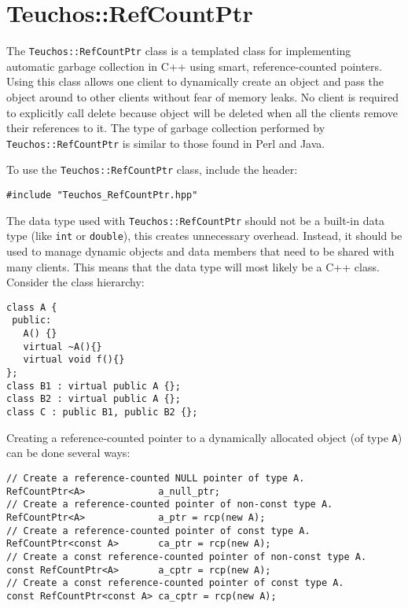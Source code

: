 
\section{Teuchos::RefCountPtr}
\label{sec:teuchos:RefCountPtr}

The \verb!Teuchos::RefCountPtr! class is a templated class for implementing
automatic garbage collection in C++ using smart, reference-counted pointers.
Using this class allows one client to dynamically create an object and pass
the object around to other clients without fear of memory leaks.  
No client is required to explicitly
call delete because object will be deleted when all the clients remove their
references to it.  The type of garbage collection performed by \verb!Teuchos::RefCountPtr! is similar to those found in Perl and Java.

To use the \verb!Teuchos::RefCountPtr! class, include the header:
{\small 
\begin{verbatim}
#include "Teuchos_RefCountPtr.hpp"
\end{verbatim}}
The data type used with {\tt Teuchos::RefCountPtr} should not 
be a built-in data type (like {\tt int} or {\tt double}), this creates unnecessary 
overhead.  Instead, it should be used to manage dynamic objects 
and data members that need to be shared with many clients.  This means that the data type 
will most likely be a C++ class.  Consider the class hierarchy:
{\small
\begin{verbatim}
class A { 
 public: 
   A() {}
   virtual ~A(){} 
   virtual void f(){} 
};   
class B1 : virtual public A {};
class B2 : virtual public A {};
class C : public B1, public B2 {};
\end{verbatim}}

Creating a reference-counted pointer to a dynamically allocated object (of type {\tt A}) can be done several ways:

{\small 
\begin{verbatim}
// Create a reference-counted NULL pointer of type A.
RefCountPtr<A>	           a_null_ptr;
// Create a reference-counted pointer of non-const type A.
RefCountPtr<A>             a_ptr = rcp(new A);
// Create a reference-counted pointer of const type A.
RefCountPtr<const A>       ca_ptr = rcp(new A);
// Create a const reference-counted pointer of non-const type A.
const RefCountPtr<A>       a_cptr = rcp(new A); 
// Create a const reference-counted pointer of const type A.
const RefCountPtr<const A> ca_cptr = rcp(new A); 
\end{verbatim}}

